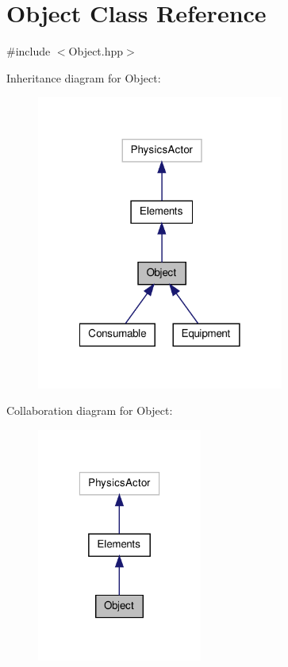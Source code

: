 \hypertarget{class_object}{\section{Object Class Reference}
\label{class_object}
}


{\ttfamily \#include $<$Object.\-hpp$>$}



Inheritance diagram for Object\-:
\nopagebreak
\begin{figure}[H]
\begin{center}
\leavevmode
\includegraphics[width=230pt]{class_object__inherit__graph}
\end{center}
\end{figure}


Collaboration diagram for Object\-:
\nopagebreak
\begin{figure}[H]
\begin{center}
\leavevmode
\includegraphics[width=154pt]{class_object__coll__graph}
\end{center}
\end{figure}
